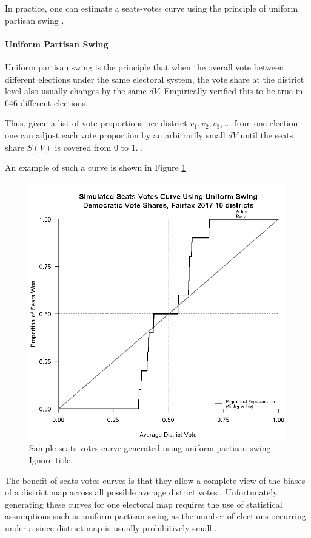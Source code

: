 In practice, one can estimate a seats-votes curve using the principle of uniform partisan swing \parencite{tufte1973}.

\paragraph{Uniform Partisan Swing}
\label{sec:ups}

Uniform partisan swing is the principle that when the overall vote between different elections under the same electoral system, the vote share at the district level also usually changes by the same $dV$. \textcite{katz2020} Empirically verified this to be true in 646 different elections. 

Thus, given a list of vote proportions per district ${v_1, v_2, v_3, ...}$ from one election, one can adjust each vote proportion by an arbitrarily small $dV$ until the seats share $S(V)$ is covered from 0 to 1. \parencite{katz2020}.

An example of such a curve is shown in Figure \ref{fig:seatsvotesups1}

\begin{figure}
    \centering
    \includegraphics[width=0.5\linewidth]{img/seatsvotesups.png}
    \caption{Sample seats-votes curve generated using uniform partisan swing. Ignore title. \parencite[175]{katz2020}}
    \label{fig:seatsvotesups1}
\end{figure}

The benefit of seats-votes curves is that they allow a complete view of the biases of a district map across all possible average district votes \parencite{gelman1994}. Unfortunately, generating these curves for one electoral map requires the use of statistical assumptions such as uniform partisan swing as the number of elections occurring under a since district map is usually prohibitively small \parencite{warrington2018}.

